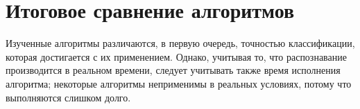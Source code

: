 









\section{Итоговое сравнение алгоритмов}

Изученные алгоритмы различаются, в первую очередь, точностью классификации, которая достигается с их применением. Однако, учитывая то, что распознавание производится в реальном времени, следует учитывать также время исполнения алгоритма; некоторые алгоритмы неприменимы в реальных условиях, потому что выполняются слишком долго.

